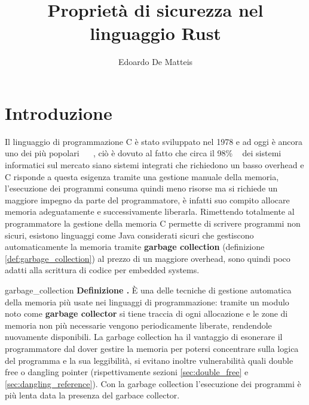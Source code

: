 \documentclass[Lau,binding=0.6cm]{sapthesis}
\title{Proprietà di sicurezza nel linguaggio Rust}
\author{Edoardo De Matteis}
\newenvironment{myDefinition}[2]{ \begin{Definizione}[adjusted title=#1]{}{#2}
    \textbf{Definizione \thetcbcounter.} }{\end{Definizione}}
\begin{document}
\frontmatter

\maketitle




\tableofcontents


\mainmatter

\chapter{Introduzione}

Il linguaggio di programmazione C è stato sviluppato nel 1978 e ad oggi è ancora uno dei più popolari ~\cite{tiobe:index} ~\cite{pypl:index}, ciò è dovuto al fatto che circa il 98\% ~\cite{real_men_program_in_c} dei sistemi informatici sul mercato siano sistemi integrati che richiedono un basso overhead e C risponde a questa esigenza tramite una gestione manuale della memoria, l'esecuzione dei programmi consuma quindi meno risorse ma si richiede un maggiore impegno da parte del programmatore, è infatti suo compito allocare memoria adeguatamente e successivamente liberarla. 
Rimettendo totalmente al programmatore la gestione della memoria C permette di scrivere programmi non sicuri, esistono linguaggi come Java considerati sicuri che gestiscono automaticamente la memoria tramite \textbf{garbage collection} (definizione \ref{def:garbage_collection}) al prezzo di un maggiore overhead, sono quindi poco adatti alla scrittura di codice per embedded systems.

\begin{myDefinition}{Garbage collection}{garbage_collection}
    È una delle tecniche di gestione automatica della memoria più usate nei linguaggi di programmazione: tramite un modulo noto come \textbf{garbage collector} si tiene traccia di ogni allocazione e le zone di memoria non più necessarie vengono periodicamente liberate, rendendole nuovamente disponibili. 
    La garbage collection ha il vantaggio di esonerare il programmatore dal dover gestire la memoria per potersi concentrare sulla logica del programma e la sua leggibilità, si evitano inoltre vulnerabilità quali double free o dangling pointer (rispettivamente sezioni \ref{sec:double_free} e \ref{sec:dangling_reference}). 
    Con la garbage collection l'esecuzione dei programmi è più lenta data la presenza del garbace collector.
\end{myDefinition}
\end{document}
